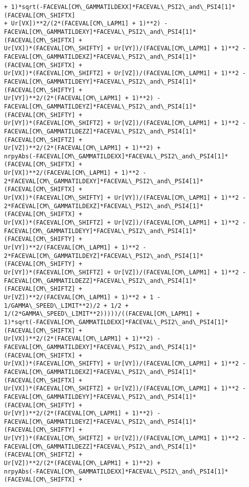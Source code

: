\documentclass[landscape,letterpaper,10pt,english]{article}
\begin{document}
\begin{Verbatim}[commandchars=\\\{\}]
+ 1)*sqrt(-FACEVAL[CM\_GAMMATILDEXX]*FACEVAL\_PSI2\_and\_PSI4[1]*(FACEVAL[CM\_SHIFTX]
+ Ur[VX])**2/(2*(FACEVAL[CM\_LAPM1] + 1)**2) -
FACEVAL[CM\_GAMMATILDEXY]*FACEVAL\_PSI2\_and\_PSI4[1]*(FACEVAL[CM\_SHIFTX] +
Ur[VX])*(FACEVAL[CM\_SHIFTY] + Ur[VY])/(FACEVAL[CM\_LAPM1] + 1)**2 -
FACEVAL[CM\_GAMMATILDEXZ]*FACEVAL\_PSI2\_and\_PSI4[1]*(FACEVAL[CM\_SHIFTX] +
Ur[VX])*(FACEVAL[CM\_SHIFTZ] + Ur[VZ])/(FACEVAL[CM\_LAPM1] + 1)**2 -
FACEVAL[CM\_GAMMATILDEYY]*FACEVAL\_PSI2\_and\_PSI4[1]*(FACEVAL[CM\_SHIFTY] +
Ur[VY])**2/(2*(FACEVAL[CM\_LAPM1] + 1)**2) -
FACEVAL[CM\_GAMMATILDEYZ]*FACEVAL\_PSI2\_and\_PSI4[1]*(FACEVAL[CM\_SHIFTY] +
Ur[VY])*(FACEVAL[CM\_SHIFTZ] + Ur[VZ])/(FACEVAL[CM\_LAPM1] + 1)**2 -
FACEVAL[CM\_GAMMATILDEZZ]*FACEVAL\_PSI2\_and\_PSI4[1]*(FACEVAL[CM\_SHIFTZ] +
Ur[VZ])**2/(2*(FACEVAL[CM\_LAPM1] + 1)**2) +
nrpyAbs(-FACEVAL[CM\_GAMMATILDEXX]*FACEVAL\_PSI2\_and\_PSI4[1]*(FACEVAL[CM\_SHIFTX] +
Ur[VX])**2/(FACEVAL[CM\_LAPM1] + 1)**2 -
2*FACEVAL[CM\_GAMMATILDEXY]*FACEVAL\_PSI2\_and\_PSI4[1]*(FACEVAL[CM\_SHIFTX] +
Ur[VX])*(FACEVAL[CM\_SHIFTY] + Ur[VY])/(FACEVAL[CM\_LAPM1] + 1)**2 -
2*FACEVAL[CM\_GAMMATILDEXZ]*FACEVAL\_PSI2\_and\_PSI4[1]*(FACEVAL[CM\_SHIFTX] +
Ur[VX])*(FACEVAL[CM\_SHIFTZ] + Ur[VZ])/(FACEVAL[CM\_LAPM1] + 1)**2 -
FACEVAL[CM\_GAMMATILDEYY]*FACEVAL\_PSI2\_and\_PSI4[1]*(FACEVAL[CM\_SHIFTY] +
Ur[VY])**2/(FACEVAL[CM\_LAPM1] + 1)**2 -
2*FACEVAL[CM\_GAMMATILDEYZ]*FACEVAL\_PSI2\_and\_PSI4[1]*(FACEVAL[CM\_SHIFTY] +
Ur[VY])*(FACEVAL[CM\_SHIFTZ] + Ur[VZ])/(FACEVAL[CM\_LAPM1] + 1)**2 -
FACEVAL[CM\_GAMMATILDEZZ]*FACEVAL\_PSI2\_and\_PSI4[1]*(FACEVAL[CM\_SHIFTZ] +
Ur[VZ])**2/(FACEVAL[CM\_LAPM1] + 1)**2 + 1 - 1/GAMMA\_SPEED\_LIMIT**2)/2 + 1/2 +
1/(2*GAMMA\_SPEED\_LIMIT**2)))))/((FACEVAL[CM\_LAPM1] +
1)*sqrt(-FACEVAL[CM\_GAMMATILDEXX]*FACEVAL\_PSI2\_and\_PSI4[1]*(FACEVAL[CM\_SHIFTX] +
Ur[VX])**2/(2*(FACEVAL[CM\_LAPM1] + 1)**2) -
FACEVAL[CM\_GAMMATILDEXY]*FACEVAL\_PSI2\_and\_PSI4[1]*(FACEVAL[CM\_SHIFTX] +
Ur[VX])*(FACEVAL[CM\_SHIFTY] + Ur[VY])/(FACEVAL[CM\_LAPM1] + 1)**2 -
FACEVAL[CM\_GAMMATILDEXZ]*FACEVAL\_PSI2\_and\_PSI4[1]*(FACEVAL[CM\_SHIFTX] +
Ur[VX])*(FACEVAL[CM\_SHIFTZ] + Ur[VZ])/(FACEVAL[CM\_LAPM1] + 1)**2 -
FACEVAL[CM\_GAMMATILDEYY]*FACEVAL\_PSI2\_and\_PSI4[1]*(FACEVAL[CM\_SHIFTY] +
Ur[VY])**2/(2*(FACEVAL[CM\_LAPM1] + 1)**2) -
FACEVAL[CM\_GAMMATILDEYZ]*FACEVAL\_PSI2\_and\_PSI4[1]*(FACEVAL[CM\_SHIFTY] +
Ur[VY])*(FACEVAL[CM\_SHIFTZ] + Ur[VZ])/(FACEVAL[CM\_LAPM1] + 1)**2 -
FACEVAL[CM\_GAMMATILDEZZ]*FACEVAL\_PSI2\_and\_PSI4[1]*(FACEVAL[CM\_SHIFTZ] +
Ur[VZ])**2/(2*(FACEVAL[CM\_LAPM1] + 1)**2) +
nrpyAbs(-FACEVAL[CM\_GAMMATILDEXX]*FACEVAL\_PSI2\_and\_PSI4[1]*(FACEVAL[CM\_SHIFTX] +

\end{Verbatim}
\end{document}

